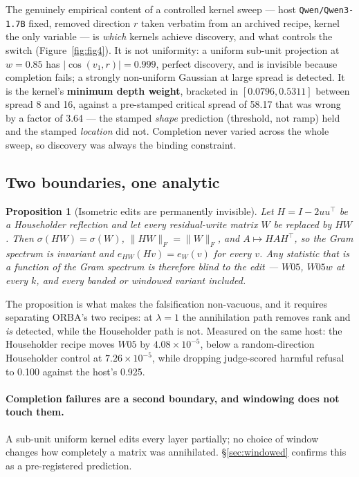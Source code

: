 \documentclass[11pt,letterpaper]{article}
\newtheorem{proposition}{Proposition}
\begin{document}
The genuinely empirical content of a controlled kernel sweep --- host \texttt{Qwen/Qwen3-1.7B} fixed, removed direction $r$ taken verbatim from an archived recipe, kernel the only variable --- is \emph{which} kernels achieve discovery, and what controls the switch (Figure~\ref{fig:fig4}). It is not uniformity: a uniform sub-unit projection at $w = 0.85$ has $|\cos(v_1,r)| = 0.999$, perfect discovery, and is invisible because completion fails; a strongly non-uniform Gaussian at large spread is detected. It is the kernel's \textbf{minimum depth weight}, bracketed in $[0.0796, 0.5311]$ between spread 8 and 16, against a pre-stamped critical spread of 58.17 that was wrong by a factor of 3.64 --- the stamped \emph{shape} prediction (threshold, not ramp) held and the stamped \emph{location} did not. Completion never varied across the whole sweep, so discovery was always the binding constraint.

\subsection{Two boundaries, one analytic}
\label{sec:boundaries}

\begin{proposition}[Isometric edits are permanently invisible]
\label{prop:iso}
Let $H = I - 2uu^\top$ be a Householder reflection and let every residual-write matrix $W$ be replaced by $HW$. Then $\sigma(HW) = \sigma(W)$, $\lVert HW\rVert_F = \lVert W\rVert_F$, and $A \mapsto HAH^\top$, so the Gram spectrum is invariant and $e_{HW}(Hv) = e_W(v)$ for every $v$. Any statistic that is a function of the Gram spectrum is therefore blind to the edit --- $W05$, $W05w$ at every $k$, and every banded or windowed variant included.
\end{proposition}

The proposition is what makes the falsification non-vacuous, and it requires separating ORBA's two recipes: at $\lambda = 1$ the annihilation path removes rank and \emph{is} detected, while the Householder path is not. Measured on the same host: the Householder recipe moves $W05$ by $4.08\times10^{-5}$, below a random-direction Householder control at $7.26\times10^{-5}$, while dropping judge-scored harmful refusal to 0.100 against the host's 0.925.

\paragraph{Completion failures are a second boundary, and windowing does not touch them.} A sub-unit uniform kernel edits every layer partially; no choice of window changes how completely a matrix was annihilated. \S\ref{sec:windowed} confirms this as a pre-registered prediction.
\end{document}
